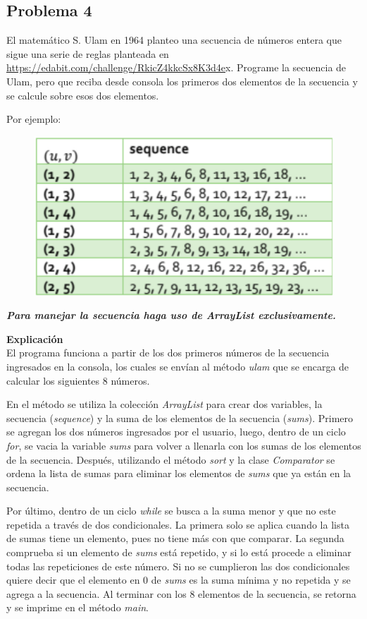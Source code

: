 \documentclass[11pt, twocolumn]{article}
\newcommand{\linejump}{\hfill \break}
\begin{document}
  \subsection*{Problema 4}
  El matemático S. Ulam en 1964 planteo una secuencia de números entera que sigue una serie de reglas planteada en \url{https://edabit.com/challenge/RkicZ4kkcSx8K3d4e}x. Programe la secuencia de Ulam, pero que reciba desde consola los primeros dos elementos de la secuencia y se calcule sobre esos dos elementos.

  Por ejemplo:
  \begin{figure}[ht]
      \includegraphics[width=0.8\columnwidth, center]{secuencia.png}
  \end{figure}

  \textbf{\textit{Para manejar la secuencia haga uso de ArrayList exclusivamente.}}

  \linejump
  \textbf{Explicación} \\
  El programa funciona a partir de los dos primeros números de la secuencia ingresados en la consola, los cuales se envían al método \textit{ulam} que se encarga de calcular los siguientes 8 números.

  En el método se utiliza la colección \textit{ArrayList} para crear dos variables, la secuencia (\textit{sequence}) y la suma de los elementos de la secuencia (\textit{sums}). Primero se agregan los dos números ingresados por el usuario, luego, dentro de un ciclo \textit{for}, se vacia la variable \textit{sums} para volver a llenarla con los sumas de los elementos de la secuencia. Después, utilizando el método \textit{sort} y la clase \textit{Comparator} se ordena la lista de sumas para eliminar los elementos de \textit{sums} que ya están en la secuencia.

  Por último, dentro de un ciclo \textit{while} se busca a la suma menor y que no este repetida a través de dos condicionales. La primera solo se aplica cuando la lista de sumas tiene un elemento, pues no tiene más con que comparar. La segunda comprueba si un elemento de \textit{sums} está repetido, y si lo está procede a eliminar todas las repeticiones de este número. Si no se cumplieron las dos condicionales quiere decir que el elemento en 0 de \textit{sums} es la suma mínima y no repetida y se agrega a la secuencia. Al terminar con los 8 elementos de la secuencia, se retorna y se imprime en el método \textit{main}.
\end{document}
